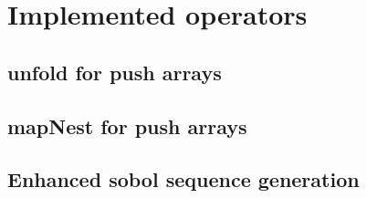 \section{Implemented operators}



\subsection{unfold for push arrays}
\subsection{mapNest for push arrays}
\subsection{Enhanced sobol sequence generation}
